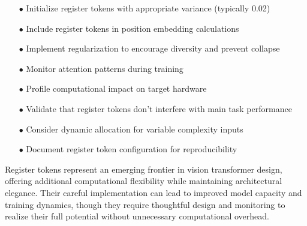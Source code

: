\begin{itemize}
    \item[$\bullet$] Initialize register tokens with appropriate variance (typically 0.02)
    \item[$\bullet$] Include register tokens in position embedding calculations
    \item[$\bullet$] Implement regularization to encourage diversity and prevent collapse
    \item[$\bullet$] Monitor attention patterns during training
    \item[$\bullet$] Profile computational impact on target hardware
    \item[$\bullet$] Validate that register tokens don't interfere with main task performance
    \item[$\bullet$] Consider dynamic allocation for variable complexity inputs
    \item[$\bullet$] Document register token configuration for reproducibility
\end{itemize}

Register tokens represent an emerging frontier in vision transformer design, offering additional computational flexibility while maintaining architectural elegance. Their careful implementation can lead to improved model capacity and training dynamics, though they require thoughtful design and monitoring to realize their full potential without unnecessary computational overhead.